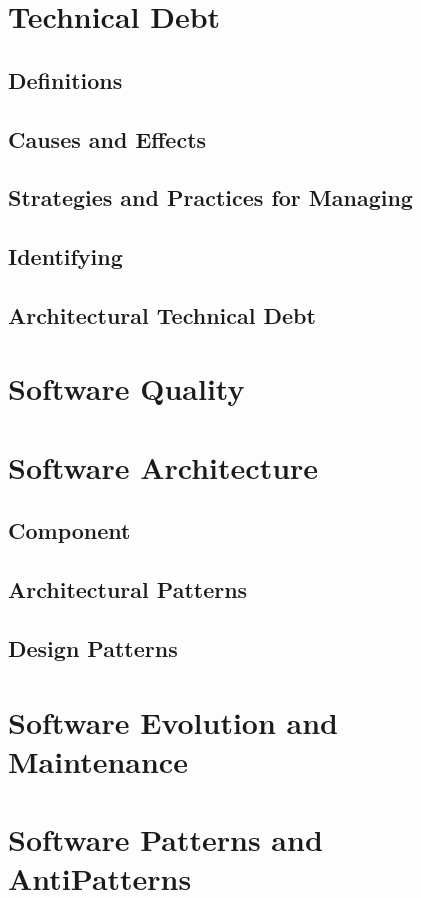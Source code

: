 {\section{Technical Debt}
\subsection{Definitions}
\subsection{Causes and Effects}
\subsection{Strategies and Practices for Managing}
\subsection{Identifying}
\subsection{Architectural Technical Debt}


\section{Software Quality}

\section{Software Architecture}
\subsection{Component}
\subsection{Architectural Patterns}
\subsection{Design Patterns}

\section{Software Evolution and Maintenance}

\section{Software Patterns and AntiPatterns}

}
